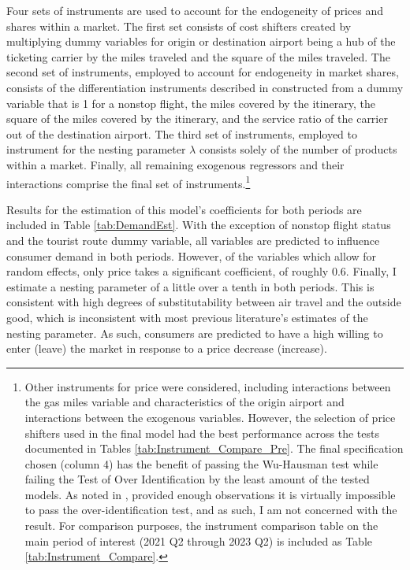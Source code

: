 \documentclass{article}
\begin{document}
	 Four sets of instruments are used to account for the endogeneity of prices and shares within a market. The first set consists of cost shifters created by multiplying dummy variables for origin or destination airport being a hub of the ticketing carrier by the miles traveled and the square of the miles traveled. The second set of instruments, employed to account for endogeneity in market shares, consists of the differentiation instruments described in \citet{gandhi_measuring_2019} constructed from a dummy variable that is 1 for a nonstop flight, the miles covered by the itinerary, the square of the miles covered by the itinerary, and the service ratio of the carrier out of the destination airport. The third set of instruments, employed to instrument for the nesting parameter $\lambda$ consists solely of the number of products within a market. Finally, all remaining exogenous regressors and their interactions comprise the final set of instruments.\footnote{Other instruments for price were considered, including interactions between the gas miles variable and characteristics of the origin airport and interactions between the exogenous variables. However, the selection of price shifters used in the final model had the best performance across the tests documented in Tables \ref{tab:Instrument_Compare_Pre}. The final specification chosen (column 4) has the benefit of passing the Wu-Hausman test while failing the Test of Over Identification by the least amount of the tested models. As noted in \citet{nevo_measuring_2001}, provided enough observations it is virtually impossible to pass the over-identification test, and as such, I am not concerned with the result. For comparison purposes, the instrument comparison table on the main period of interest (2021 Q2 through 2023 Q2) is included as Table \ref{tab:Instrument_Compare}.}
	
    Results for the estimation of this model's coefficients for both periods are included in Table \ref{tab:DemandEst}. With the exception of nonstop flight status and the tourist route dummy variable, all variables are predicted to influence consumer demand in both periods. However, of the variables which allow for random effects, only price takes a significant coefficient, of roughly $0.6$. Finally, I estimate a nesting parameter of a little over a tenth in both periods. This is consistent with high degrees of substitutability between air travel and the outside good, which is inconsistent with most previous literature's estimates of the nesting parameter. As such, consumers are predicted to have a high willing to enter (leave) the market in response to a price decrease (increase).
\end{document}
